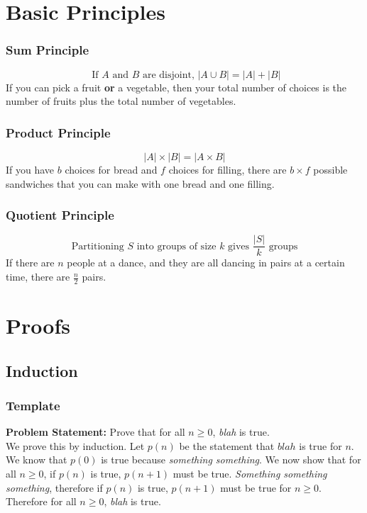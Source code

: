 \documentclass[12pt]{article}
\begin{document}
\section{Basic Principles}
\subsubsection{Sum Principle}
\[
    \text{ If }A\text{ and }B\text{ are disjoint, }|A \cup B | = |A| + |B|
\]
If you can pick a fruit \textbf{or} a vegetable, then your total number of choices is the number of fruits plus the total number of vegetables.
\subsubsection{Product Principle}
\[
    |A| \times |B| = |A \times B|
\]
If you have $b$ choices for bread and $f$ choices for filling, there are $b\times f$ possible sandwiches that you can make with one bread and one filling.

\subsubsection{Quotient Principle}
\[
    \text{Partitioning }S\text{ into groups of size }k\text{ gives }\frac{|S|}{k}\text{ groups}
\]
If there are $n$ people at a dance, and they are all dancing in pairs at a certain time, there are $\frac{n}{2}$ pairs.
\pagebreak
\section{Proofs}
\subsection{Induction}
\subsubsection{Template}

\textbf{Problem Statement:} Prove that for all $n \ge 0$, \emph{blah} is true.\\

We prove this by induction. Let $p(n)$ be the statement that $blah$ is true for $n$. We know that $p(0)$ is true because \emph{something something}. We now show that for all $n \ge 0$, if $p(n)$ is true, $p(n+1)$ must be true. \emph{Something something something}, therefore if $p(n)$ is true, $p(n+1)$ must be true for $n\ge 0$. Therefore for all $n \ge 0$, \emph{blah} is true.
    
\end{document}
